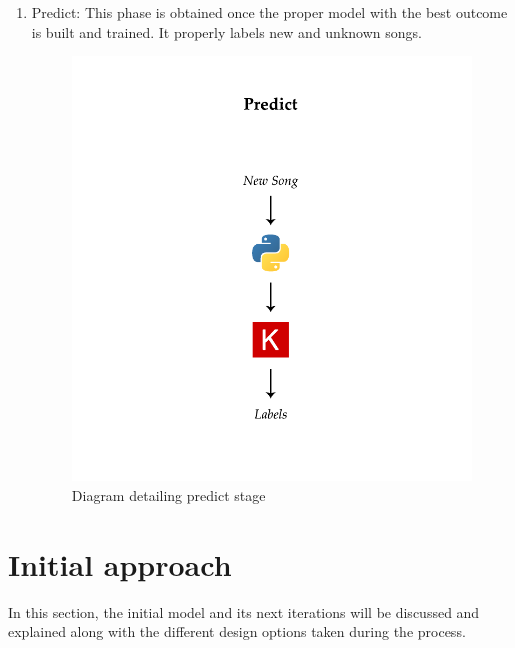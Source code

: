 \begin{itemize}
\begin{enumerate}
        \item Predict: This phase is obtained once the proper model with the best outcome is built and trained. It properly labels new and unknown songs.
        \begin{figure}[th]
            \centering
            \includegraphics{Figures/PredictStage}
            \decoRule
            \caption[Predict stage]{Diagram detailing predict stage}
            \label{fig:Predict Stage}
        \end{figure}

    \end{enumerate}

\end{itemize}

\newpage

\section{Initial approach}

In this section, the initial model and its next iterations will be discussed and explained along with the different design options taken during the process.

